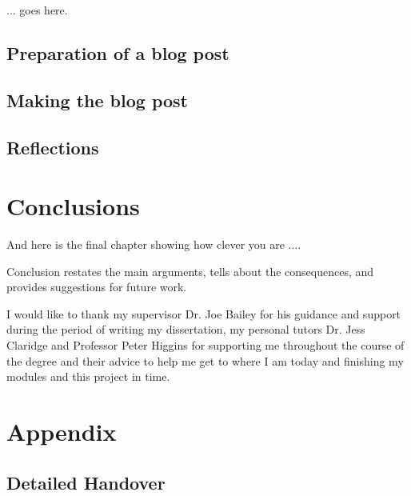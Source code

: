 \documentclass[12pt, a4paper,oneside]{book}
\numberwithin{equation}{section}
\begin{document}
... goes here.

\section{Preparation of a blog post}\label{sec:x.x}


\section{Making the blog post}\label{sec:x.x}


\section{Reflections}\label{sec:x.x}

\chapter{Conclusions}\label{ch:concl}
And here is the final chapter showing how clever you are ....

Conclusion restates the main arguments, tells about the consequences, and provides suggestions for future work.




I would like to thank my supervisor Dr. Joe Bailey for his guidance and support during the period of writing my dissertation, my personal tutors Dr. Jess Claridge and Professor Peter Higgins for supporting me throughout the course of the degree and their advice to help me get to where I am today and finishing my modules and this project in time.

\appendix


\chapter*{Appendix}

\section{Detailed Handover}
\end{document}
